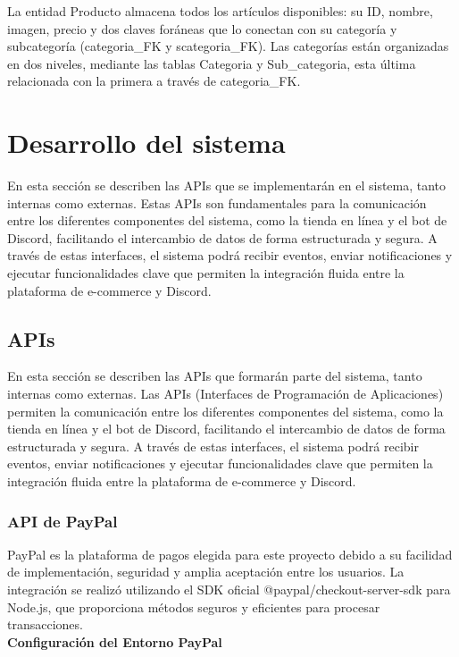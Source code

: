\documentclass[a4paper,12pt]{article}
\begin{document}
La entidad Producto almacena todos los artículos disponibles: su ID, nombre, imagen, precio y dos claves foráneas que lo conectan con su categoría y subcategoría (\textnormal{categoria\_FK} y \textnormal{scategoria\_FK}). Las categorías están organizadas en dos niveles, mediante las tablas Categoria y \textnormal{Sub\_categoria}, esta última relacionada con la primera a través de \textnormal{categoria\_FK}.


\section{Desarrollo del sistema}
En esta sección se describen las APIs que se implementarán en el sistema, tanto internas como externas. Estas APIs son fundamentales para la comunicación entre los diferentes componentes del sistema, como la tienda en línea y el bot de Discord, facilitando el intercambio de datos de forma estructurada y segura. A través de estas interfaces, el sistema podrá recibir eventos, enviar notificaciones y ejecutar funcionalidades clave que permiten la integración fluida entre la plataforma de e-commerce y Discord.
\subsection{APIs}

En esta sección se describen las APIs que formarán parte del sistema, tanto internas como externas. Las APIs (Interfaces de Programación de Aplicaciones) permiten la comunicación entre los diferentes componentes del sistema, como la tienda en línea y el bot de Discord, facilitando el intercambio de datos de forma estructurada y segura. A través de estas interfaces, el sistema podrá recibir eventos, enviar notificaciones y ejecutar funcionalidades clave que permiten la integración fluida entre la plataforma de e-commerce y Discord.

\subsubsection{API de PayPal}

PayPal es la plataforma de pagos elegida para este proyecto debido a su facilidad de implementación, seguridad y amplia aceptación entre los usuarios. La integración se realizó utilizando el SDK oficial @paypal/checkout-server-sdk para Node.js, que proporciona métodos seguros y eficientes para procesar transacciones.\\
\newpage
\textbf{Configuración del Entorno PayPal}\\
\end{document}
